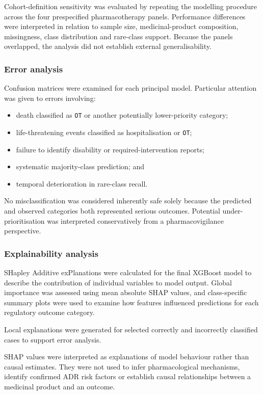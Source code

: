 \documentclass[10pt]{article}
\begin{document}
Cohort-definition sensitivity was evaluated by repeating the modelling procedure across the four prespecified pharmacotherapy panels. Performance differences were interpreted in relation to sample size, medicinal-product composition, missingness, class distribution and rare-class support. Because the panels overlapped, the analysis did not establish external generalisability.

\subsubsection{Error analysis}
Confusion matrices were examined for each principal model. Particular attention was given to errors involving:
\begin{itemize}
\item death classified as \texttt{OT} or another potentially lower-priority category;
\item life-threatening events classified as hospitalisation or \texttt{OT};
\item failure to identify disability or required-intervention reports;
\item systematic majority-class prediction; and
\item temporal deterioration in rare-class recall.
\end{itemize}
No misclassification was considered inherently safe solely because the predicted and observed categories both represented serious outcomes. Potential under-prioritisation was interpreted conservatively from a pharmacovigilance perspective.


\subsubsection{Explainability analysis}
SHapley Additive exPlanations were calculated for the final XGBoost model to describe the contribution of individual variables to model output. Global importance was assessed using mean absolute SHAP values, and class-specific summary plots were used to examine how features influenced predictions for each regulatory outcome category.

Local explanations were generated for selected correctly and incorrectly classified cases to support error analysis.

SHAP values were interpreted as explanations of model behaviour rather than causal estimates. They were not used to infer pharmacological mechanisms, identify confirmed ADR risk factors or establish causal relationships between a medicinal product and an outcome.
\end{document}
